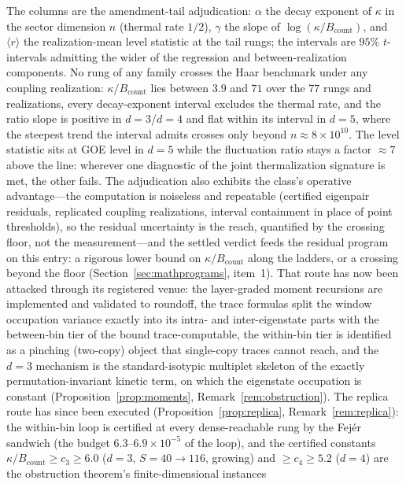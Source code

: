 \noindent The columns are the amendment-tail adjudication: $\alpha$ the decay exponent
of $\kappa$ in the sector dimension $n$ (thermal rate $1/2$), $\gamma$ the slope of
$\log(\kappa/B_{\mathrm{count}})$, and $\langle r\rangle$ the realization-mean level
statistic at the tail rungs; the intervals are $95\%$ $t$-intervals admitting the wider
of the regression and between-realization components. No rung of any family crosses
the Haar benchmark under any coupling realization: $\kappa/B_{\mathrm{count}}$ lies
between $3.9$ and $71$ over the $77$ rungs and realizations, every decay-exponent
interval excludes the thermal rate, and the ratio slope is positive in $d=3$/$d=4$ and
flat within its interval in $d=5$, where the steepest trend the interval admits crosses
only beyond $n\approx8\times10^{10}$. The level statistic sits at GOE level in $d=5$
while the fluctuation ratio stays a factor $\approx7$ above the line: wherever one
diagnostic of the joint thermalization signature is met, the other fails. The
adjudication also exhibits the class's operative advantage---the computation is
noiseless and repeatable (certified eigenpair residuals, replicated coupling
realizations, interval containment in place of point thresholds), so the residual
uncertainty is the reach, quantified by the crossing floor, not the measurement---and
the settled verdict feeds the residual program on this entry: a rigorous lower bound on
$\kappa/B_{\mathrm{count}}$ along the ladders, or a crossing beyond the floor
(Section~\ref{sec:mathprograms}, item~1). That route has now been attacked through its
registered venue: the layer-graded moment recursions are implemented and validated to
roundoff, the trace formulas split the window occupation variance exactly into its
intra- and inter-eigenstate parts with the between-bin tier of the bound
trace-computable, the within-bin tier is identified as a pinching (two-copy) object
that single-copy traces cannot reach, and the $d=3$ mechanism is the standard-isotypic
multiplet skeleton of the exactly permutation-invariant kinetic term, on which the
eigenstate occupation is constant
(Proposition~\ref{prop:moments}, Remark~\ref{rem:obstruction}). The replica route has
since been executed (Proposition~\ref{prop:replica}, Remark~\ref{rem:replica}): the
within-bin loop is certified at every dense-reachable rung by the Fej\'er sandwich
(the budget $6.3$--$6.9\times10^{-5}$ of the loop), and the certified constants
$\kappa/B_{\mathrm{count}}\ge c_{3}\ge6.0$ ($d=3$, $S=40\to116$, growing) and
$\ge c_{4}\ge5.2$ ($d=4$) are the obstruction theorem's finite-dimensional instances
